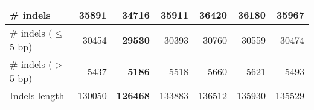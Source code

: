 \documentclass[12pt,a4paper]{article}
\begin{document}
\begin{table}[ht]
\begin{center}
\begin{tabular}{|l*{6}{|r}|}
\# indels & 35891 & {\bf 34716} & 35911 & 36420 & 36180 & 35967 \\ \hline
\hspace{5mm}\# indels ($\leq$ 5 bp) & 30454 & {\bf 29530} & 30393 & 30760 & 30559 & 30474 \\ \hline
\hspace{5mm}\# indels ($>$ 5 bp) & 5437 & {\bf 5186} & 5518 & 5660 & 5621 & 5493 \\ \hline
Indels length & 130050 & {\bf 126468} & 133883 & 136512 & 135930 & 135529 \\ \hline
\end{tabular}
\end{center}
\end{table}
\end{document}
